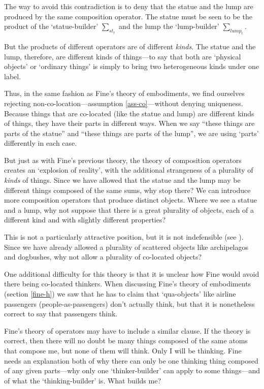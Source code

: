 \documentclass[11pt]{article}
\begin{document}
\begin{spacing}{1.5}
The way to avoid this contradiction is to deny that the statue and the
lump are produced by the same composition operator.  The statue must
be seen to be the product of the `statue-builder' $\sum _{st_t}$ and
the lump the `lump-builder' $\sum _{lump_t}$.

But the products of different operators are of different {\em kinds}.
The statue and the lump, therefore, are different kinds of things---to
say that both are `physical objects' or `ordinary things' is simply to
bring two heterogeneous kinds under one label.

Thus, in the same fashion as Fine's theory of embodiments, we find
ourselves rejecting non-co-location---assumption
\ref{ass-co}---without denying uniqueness.  Because things that are
co-located (like the statue and lump) are different kinds of things,
they have their parts in different ways.  When we say ``these things
are parts of the statue'' and ``these things are parts of the lump'',
we are using `parts' differently in each case.

But just as with Fine's previous theory, the theory of composition
operators creates an `explosion of reality', with the additional
strangeness of a plurality of {\em kinds} of things.  Since we have
allowed that the statue and the lump may be different things composed
of the same sums, why stop there?  We can introduce more composition
operators that produce distinct objects.  Where we see a statue and a
lump, why not suppose that there is a great plurality of objects, each
of a different kind and with slightly different properties?

This is not a particularly attractive position, but it is not
indefensible (see \citet[section 4]{bennett2004}).  Since we have
already allowed a plurality of scattered objects like archipelagos and
dogbushes, why not allow a plurality of co-located objects?

One additional difficulty for this theory is that it is unclear how
Fine would avoid there being co-located thinkers.  When discussing
Fine's theory of embodiments (section \ref{fine-h}) we saw that he has
to claim that `qua-objects' like airline passengers
(people-as-passengers) don't actually think, but that it is
nonetheless correct to say that passengers think.

Fine's theory of operators may have to include a similar clause.  If
the theory is correct, then there will no doubt be many things
composed of the same atoms that compose me, but none of them will
think.  Only I will be thinking.  Fine needs an explanation both of
why there can only be one thinking thing composed of any given
parts---why only one `thinker-builder' can apply to some things---and
of what the `thinking-builder' is.  What builds me?


\end{spacing}
\end{document}
